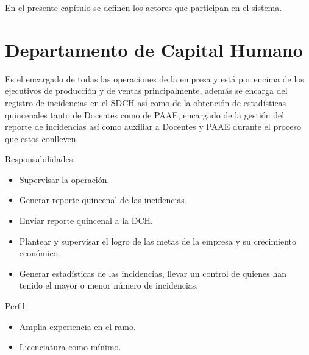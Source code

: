 \label{cap:actores}

En el presente capítulo se definen los actores que participan en el sistema.

\begin{Actor}{\hypertarget{Actor: Departamento de Capital Humano}{\section{Departamento de Capital Humano}}}{
	Es el encargado de todas las operaciones de la empresa y está por encima de los ejecutivos de producción y de ventas principalmente, además se encarga del registro de incidencias en el SDCH así como de la obtención de estadísticas quincenales tanto de Docentes como de PAAE, encargado de la gestión del reporte de incidencias así como auxiliar a Docentes y PAAE durante el proceso que estos conlleven. 
}
    \item[Responsabilidades:] \ISenter
    \begin{itemize}
		\item Supervisar la operación.
		\item Generar reporte quincenal de las incidencias.
		\item Enviar reporte quincenal a la DCH.
		\item Plantear y supervisar el logro de las metas de la empresa y su crecimiento económico.
		\item  Generar estadísticas de las incidencias, llevar un control de quienes han tenido el mayor o menor número de incidencias.
    \end{itemize}

	\item[Perfil:] \ISenter
    \begin{itemize}
		\item Amplia experiencia en el ramo.
		\item Licenciatura como mínimo.
    \end{itemize}
\end{Actor}

